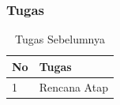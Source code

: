 \documentclass[../main.tex]{subfiles}
\begin{document}
\begin{frame}[mytitle=standard,t,mycolor=digiPH_creamy,dark]
	\frametitle{Tugas}
	\begin{table}[htb]
		\caption{Tugas Sebelumnya}
		\begin{tabularx}{\textwidth}{|p{1cm}|X|}
			\hline
			\textbf{No} & \textbf{Tugas} \\ \hline
			1           & Rencana Atap   \\ \hline
		\end{tabularx}
	\end{table}
\end{frame}



\end{document}

